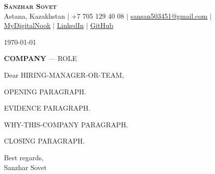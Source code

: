 \documentclass[letterpaper,11pt]{article}
\begin{document}
\begin{center}
    \textbf{\Huge \scshape Sanzhar Sovet} \\ \vspace{1pt}
    \small Astana, Kazakhstan $|$ +7 705 129 40 08 $|$
    \href{mailto:sansan503451@gmail.com}{\underline{sansan503451@gmail.com}} $|$
    \href{https://sovetskiysn.github.io/MyDigitalNook/}{\underline{MyDigitalNook}} $|$
    \href{https://www.linkedin.com/in/sanzhar-sovet-a04620236/}{\underline{LinkedIn}} $|$
    \href{https://github.com/sovetskiysn}{\underline{GitHub}}
\end{center}

\vspace{8pt}

\today

\textbf{COMPANY} --- ROLE

Dear HIRING-MANAGER-OR-TEAM,

OPENING PARAGRAPH.

EVIDENCE PARAGRAPH.

WHY-THIS-COMPANY PARAGRAPH.

CLOSING PARAGRAPH.

Best regards, \\
Sanzhar Sovet
\end{document}
